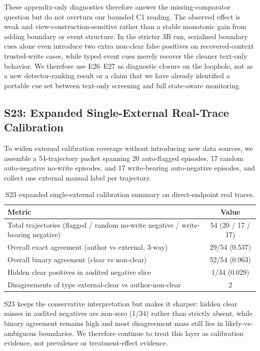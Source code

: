 These appendix-only diagnostics therefore answer the missing-comparator question but do not overturn our bounded C1 reading. The observed effect is weak and view-construction-sensitive rather than a stable monotonic gain from adding boundary or event structure. In the stricter 3B run, serialized boundary cues alone even introduce two extra non-clear false positives on recovered-context trusted-write cases, while typed event cues merely recover the cleaner text-only behavior. We therefore use E26--E27 as diagnostic closure on the loophole, not as a new detector-ranking result or a claim that we have already identified a portable cue set between text-only screening and full state-aware monitoring.

\subsection{S23: Expanded Single-External Real-Trace Calibration}

To widen external calibration coverage without introducing new data sources, we assemble a 54-trajectory packet spanning 20 auto-flagged episodes, 17 random auto-negative no-write episodes, and 17 write-bearing auto-negative episodes, and collect one external manual label per trajectory.

\begin{table}[t]
\centering
\scriptsize
\caption{S23 expanded single-external calibration summary on direct-endpoint real traces.}
\begin{tabular}{lc}
\toprule
\textbf{Metric} & \textbf{Value} \\
\midrule
Total trajectories (flagged / random no-write negative / write-bearing negative) & 54 (20 / 17 / 17) \\
Overall exact agreement (author vs external, 3-way) & 29/54 (0.537) \\
Overall binary agreement (clear vs non-clear) & 52/54 (0.963) \\
Hidden clear positives in audited negative slice & 1/34 (0.029) \\
Disagreements of type external-clear vs author-non-clear & 2 \\
\bottomrule
\end{tabular}
\label{tab:supp_s23_expanded_external}
\end{table}

S23 keeps the conservative interpretation but makes it sharper: hidden clear misses in audited negatives are non-zero (1/34) rather than strictly absent, while binary agreement remains high and most disagreement mass still lies in likely-vs-ambiguous boundaries. We therefore continue to treat this layer as calibration evidence, not prevalence or treatment-effect evidence.

